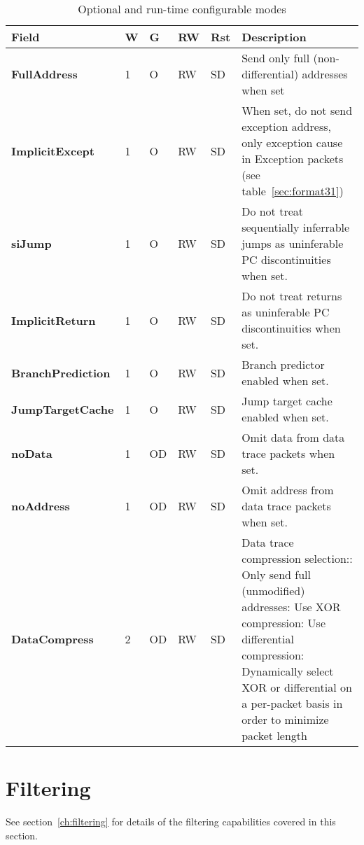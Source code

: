 \begin{table}[htp]
  \centering
  \caption{Optional and run-time configurable modes}
  \label{tab:ctl-resync}
  \begin{tabulary}{\textwidth}{|l|l|l|l|l|p{80mm}|}
    \hline
    {\bf Field} & {\bf W} & {\bf G} & {\bf RW} & {\bf Rst} & {\bf Description} \\
    \hline
    \textbf{FullAddress} & 1 & O & RW & SD & Send only full (non-differential) addresses when set\\
    \hline
    \textbf{ImplicitExcept} & 1 & O & RW & SD & When set, do not send exception address, only exception cause in 
      Exception packets (see table~\ref{sec:format31})\\
    \hline
    \textbf{siJump} & 1 & O & RW & SD & Do not treat sequentially inferrable jumps as uninferable PC discontinuities when set.\\
    \hline
    \textbf{ImplicitReturn} & 1 & O & RW & SD & Do not treat returns as uninferable PC discontinuities when set.\\
    \hline
    \textbf{BranchPrediction} & 1 & O & RW & SD & Branch predictor enabled when set.\\
    \hline
    \textbf{JumpTargetCache} & 1 & O & RW & SD & Jump target cache enabled when set.\\
    \hline
    \textbf{noData} & 1 & OD & RW & SD & Omit data from data trace packets when set.\\
    \hline
    \textbf{noAddress} & 1 & OD & RW & SD & Omit address from data trace packets when set.\\
    \hline
    \textbf{DataCompress} & 2 & OD & RW & SD & Data trace compression selection:: Only send full (unmodified) addresses: Use XOR compression: Use differential compression: Dynamically select XOR or differential on a per-packet basis in order to minimize packet length\\
    \hline
  \end{tabulary}
\end{table}


\section{Filtering} \label{sec:ctl-filter}

See section~\ref{ch:filtering} for details of the filtering capabilities covered in this section.


